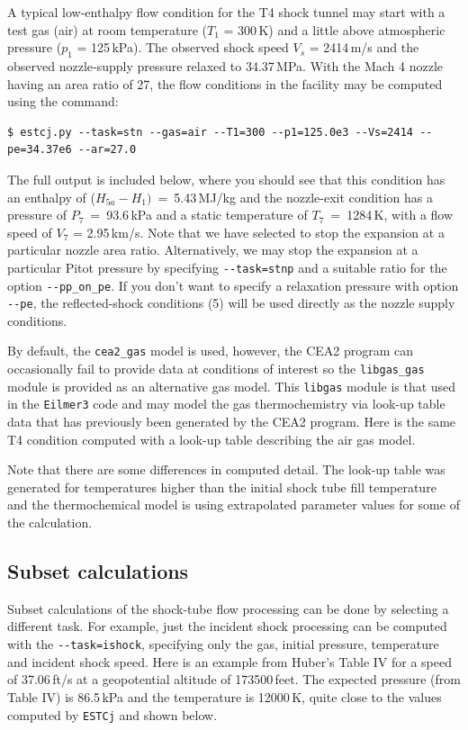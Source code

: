 \documentclass[landscape,12pt,a4paper]{article}
\begin{document}
\medskip
A typical low-enthalpy flow condition for the T4 shock tunnel may start with
a test gas (air) at room temperature ($T_1$ = 300\,K) 
and a little above atmospheric pressure ($p_1$ = 125\,kPa).
The observed shock speed $V_s$ = 2414\,m/s and the observed nozzle-supply pressure
relaxed to 34.37\,MPa.
With the Mach 4 nozzle having an area ratio of 27, the flow conditions in the facility
may be computed using the command:
\begin{verbatim}
$ estcj.py --task=stn --gas=air --T1=300 --p1=125.0e3 --Vs=2414 --pe=34.37e6 --ar=27.0
\end{verbatim}
The full output is included below, where you should see that
this condition has an enthalpy of ($H_{5a} - H_1)$~=~5.43\,MJ/kg and the nozzle-exit condition
has a pressure of $P_7$~=~93.6\,kPa and a static temperature of $T_7$~=~1284\,K,
with a flow speed of $V_7$ = 2.95\,km/s.
Note that we have selected to stop the expansion at a particular nozzle area ratio.
Alternatively, we may stop the expansion at a particular Pitot pressure by specifying
\verb?--task=stnp? and a suitable ratio for the option \verb?--pp_on_pe?.
If you don't want to specify a relaxation pressure with option \verb?--pe?,
the reflected-shock conditions (5) will be used directly as the nozzle supply conditions.



\medskip
By default, the \verb!cea2_gas! model is used, however, the CEA2 program can occasionally fail
to provide data at conditions of interest so the \verb!libgas_gas! module is provided 
as an alternative gas model.
This \verb!libgas! module is that used in the \verb!Eilmer3! code and may model the gas 
thermochemistry via look-up table data that has previously been generated by the CEA2 program. 
Here is the same T4 condition computed with a look-up table describing the air gas model.



Note that there are some differences in computed detail.  
The look-up table was generated for temperatures higher than the initial shock tube 
fill temperature and the thermochemical model is using extrapolated parameter values 
for some of the calculation.

\subsection{Subset calculations}
%
Subset calculations of the shock-tube flow processing can be done by selecting a different task.
For example, just the incident shock processing can be computed with the \verb?--task=ishock?,
specifying only the gas, initial pressure, temperature and incident shock speed.
Here is an example from Huber's \cite{huber_1963a} Table IV for a speed of 37.06\,ft/s 
at a geopotential altitude of 173500\,feet.
The expected pressure (from Table IV) is 86.5\,kPa and the temperature is 12000\,K,
quite close to the values computed by \verb!ESTCj! and shown below.
\end{document}
